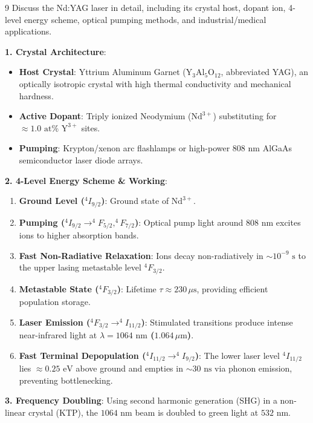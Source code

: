 \begin{theoryq}{9}
Discuss the Nd:YAG laser in detail, including its crystal host, dopant ion, 4-level energy scheme, optical pumping methods, and industrial/medical applications.
\end{theoryq}
\begin{theorysol}
\textbf{1. Crystal Architecture}:
\begin{itemize}
    \item \textbf{Host Crystal}: Yttrium Aluminum Garnet ($\text{Y}_3\text{Al}_5\text{O}_{12}$, abbreviated YAG), an optically isotropic crystal with high thermal conductivity and mechanical hardness.
    \item \textbf{Active Dopant}: Triply ionized Neodymium ($\text{Nd}^{3+}$) substituting for $\approx 1.0\text{ at}\%\text{ Y}^{3+}$ sites.
    \item \textbf{Pumping}: Krypton/xenon arc flashlamps or high-power $808\text{ nm}$ AlGaAs semiconductor laser diode arrays.
\end{itemize}

\textbf{2. 4-Level Energy Scheme \& Working}:
\begin{enumerate}
    \item \textbf{Ground Level ($^4I_{9/2}$)}: Ground state of $\text{Nd}^{3+}$.
    \item \textbf{Pumping ($^4I_{9/2} \to ^4F_{5/2}, ^4F_{7/2}$)}: Optical pump light around $808\text{ nm}$ excites ions to higher absorption bands.
    \item \textbf{Fast Non-Radiative Relaxation}: Ions decay non-radiatively in $\sim 10^{-9}\text{ s}$ to the upper lasing metastable level $^4F_{3/2}$.
    \item \textbf{Metastable State ($^4F_{3/2}$)}: Lifetime $\tau \approx 230\,\mu\text{s}$, providing efficient population storage.
    \item \textbf{Laser Emission ($^4F_{3/2} \to ^4I_{11/2}$)}: Stimulated transitions produce intense near-infrared light at \textbf{$\lambda = 1064\text{ nm}$ ($1.064\,\mu\text{m}$)}.
    \item \textbf{Fast Terminal Depopulation ($^4I_{11/2} \to ^4I_{9/2}$)}: The lower laser level $^4I_{11/2}$ lies $\approx 0.25\text{ eV}$ above ground and empties in $\sim 30\text{ ns}$ via phonon emission, preventing bottlenecking.
\end{enumerate}

\textbf{3. Frequency Doubling}:
Using second harmonic generation (SHG) in a non-linear crystal (KTP), the $1064\text{ nm}$ beam is doubled to green light at \textbf{$532\text{ nm}$}.


\end{theorysol}

